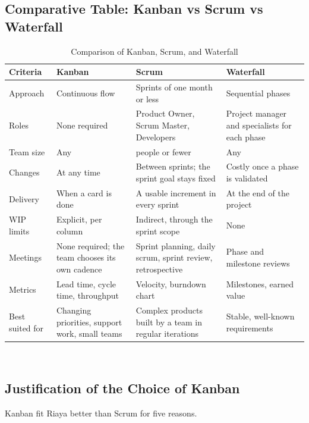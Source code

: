 \subsection{Comparative Table: Kanban vs Scrum vs Waterfall}
\begin{table}[H]
    \centering
    \caption{Comparison of Kanban, Scrum, and Waterfall}
    \label{tab:comparison_methods}
    \small
    \begin{tabular}{>{\raggedright\arraybackslash}p{\dimexpr 0.1756\dimexpr\textwidth-8\tabcolsep\relax\relax}>{\raggedright\arraybackslash}p{\dimexpr 0.2748\dimexpr\textwidth-8\tabcolsep\relax\relax}>{\raggedright\arraybackslash}p{\dimexpr 0.2748\dimexpr\textwidth-8\tabcolsep\relax\relax}>{\raggedright\arraybackslash}p{\dimexpr 0.2748\dimexpr\textwidth-8\tabcolsep\relax\relax}}
        \toprule
        \textbf{Criteria} & \textbf{Kanban} & \textbf{Scrum} & \textbf{Waterfall} \\
        \midrule
        Approach & Continuous flow & Sprints of one month or less & Sequential phases \\
        Roles & None required & Product Owner, Scrum Master, Developers & Project manager and specialists for each phase \\
        Team size & Any & 10 people or fewer & Any \\
        Changes & At any time & Between sprints; the sprint goal stays fixed & Costly once a phase is validated \\
        Delivery & When a card is done & A usable increment in every sprint & At the end of the project \\
        WIP limits & Explicit, per column & Indirect, through the sprint scope & None \\
        Meetings & None required; the team chooses its own cadence & Sprint planning, daily scrum, sprint review, retrospective & Phase and milestone reviews \\
        Metrics & Lead time, cycle time, throughput & Velocity, burndown chart & Milestones, earned value \\
        Best suited for & Changing priorities, support work, small teams & Complex products built by a team in regular iterations & Stable, well-known requirements \\
        \bottomrule
    \end{tabular}
    \\[0.2cm]
\end{table}

\subsection{Justification of the Choice of Kanban}
Kanban fit Riaya better than Scrum for five reasons.

